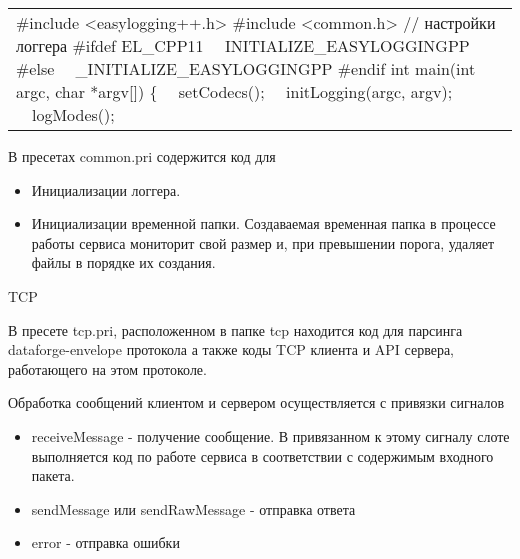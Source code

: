 \documentclass{article}
\begin{document}
\begin{flushleft}
\tablefirsthead{}
\tablehead{}
\tabletail{}
\tablelasttail{}
\begin{supertabular}{m{6.19136in}}
\#include {\textless}easylogging++.h{\textgreater}\newline
\#include {\textless}common.h{\textgreater}\newline
\newline
// настройки логгера\newline
\#ifdef EL\_CPP11\newline
\ \ INITIALIZE\_EASYLOGGINGPP\newline
\#else\newline
\ \ \_INITIALIZE\_EASYLOGGINGPP\newline
\#endif\newline
\newline
int main(int argc, char *argv[])\newline
\{\newline
\ \ setCodecs();\newline
\ \ initLogging(argc, argv);\newline
\ \ logModes();\\
\end{supertabular}
\end{flushleft}
В пресетах common.pri содержится код для

\begin{itemize}
\item Инициализации логгера.
\item Инициализации временной папки. Создаваемая временная папка в процессе работы сервиса мониторит свой размер и, при превышении порога, удаляет файлы в порядке их создания.
\end{itemize}
TCP

В пресете tcp.pri, расположенном в папке tcp находится код для парсинга dataforge-envelope протокола а также коды TCP клиента и API сервера, работающего на этом протоколе. 


\bigskip

Обработка сообщений клиентом и сервером осуществляется с привязки сигналов

\begin{itemize}
\item receiveMessage - получение сообщение. В привязанном к этому сигналу слоте выполняется код по работе сервиса в соответствии с содержимым входного пакета. 
\item sendMessage или sendRawMessage - отправка ответа
\item error - отправка ошибки
\end{itemize}
\end{document}
